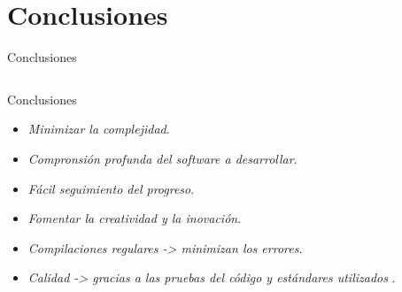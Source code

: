 \documentclass[12pt]{beamer}
\begin{document}
\section{Conclusiones}\label{Conclusiones}
\begin{frame}[fragile]{Conclusiones}
  \begin{columns}
\begin{column}{1\textwidth}\begin{center}\end{center}
Conclusiones
\begin{itemize}
\item \textit{Minimizar la complejidad}.
\item \textit{Compronsión profunda del software a desarrollar}.
\item \textit{Fácil seguimiento del progreso}.
\item \textit{Fomentar la creatividad y la inovación}. 
\item \textit{Compilaciones regulares -> minimizan los errores}. 
\item \textit{ Calidad -> gracias a las pruebas del código y estándares utilizados }.
\end{itemize}
\end{column}
\end{columns}
\end{frame}



\end{document}
